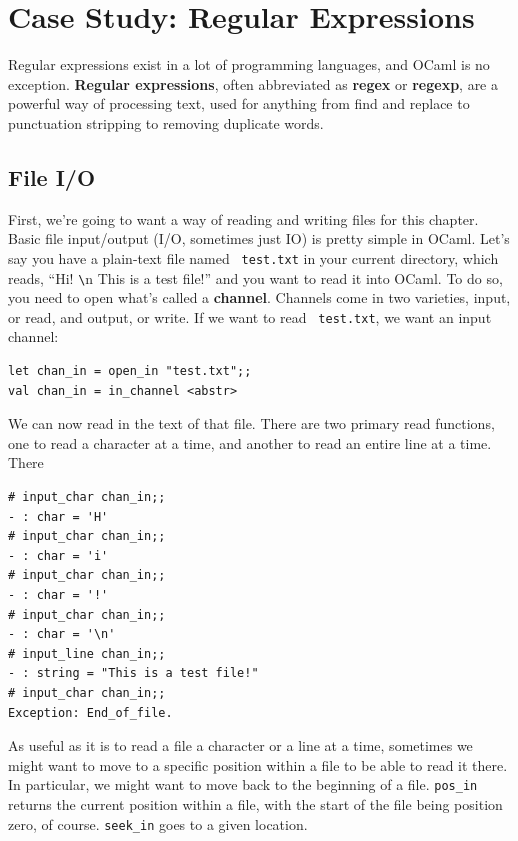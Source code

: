 \documentclass[10pt]{book}
\begin{document}
\chapter{Case Study: Regular Expressions}
\label{chap:regex}

Regular expressions exist in a lot of programming languages, and OCaml is no exception. {\bf Regular expressions}, often abbreviated as {\bf regex} or {\bf regexp}, are a powerful way of processing text, used for anything from find and replace to punctuation stripping to removing duplicate words.

\section{File I/O}


First, we're going to want a way of reading and writing files for this
chapter. Basic file input/output (I/O, sometimes just IO) is pretty
simple in OCaml. Let's say you have a plain-text file named {\tt
  test.txt} in your current directory, which reads, ``Hi! \verb"\"n This is a
test file!'' and you want to read it into OCaml. To do so, you need to
open what's called a {\bf channel}. Channels come in two varieties,
input, or read, and output, or write. If we want to read {\tt
  test.txt}, we want an input channel:

\beforeverb
\begin{verbatim}
let chan_in = open_in "test.txt";;
val chan_in = in_channel <abstr>
\end{verbatim}
\afterverb

We can now read in the text of that file. There are two primary read functions, one to read a character at a time, and another to read an entire line at a time. There 
\beforeverb
\begin{verbatim}
# input_char chan_in;;
- : char = 'H'
# input_char chan_in;;
- : char = 'i'
# input_char chan_in;;
- : char = '!'
# input_char chan_in;;
- : char = '\n'
# input_line chan_in;;
- : string = "This is a test file!"
# input_char chan_in;;
Exception: End_of_file.
\end{verbatim}
\afterverb

As useful as it is to read a file a character or a line at a time,
sometimes we might want to move to a specific position within a file
to be able to read it there. In particular, we might want to move back
to the beginning of a file. \verb"pos_in" returns the current position
within a file, with the start of the file being position zero, of
course. \verb"seek_in" goes to a given location.
\end{document}
